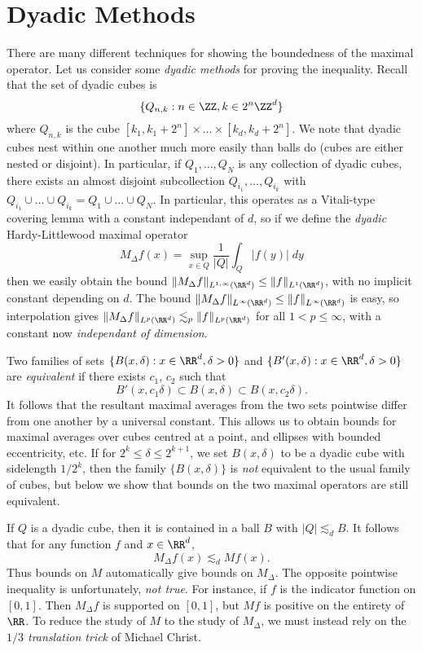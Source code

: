 \section{Dyadic Methods}

There are many different techniques for showing the boundedness of the maximal operator. Let us consider some \emph{dyadic methods} for proving the inequality. Recall that the set of dyadic cubes is
%
\[ \{ Q_{n,k} : n \in \ZZ, k \in 2^n \ZZ^d \} \]
%
where $Q_{n,k}$ is the cube $[k_1, k_1 + 2^n] \times \dots \times [k_d, k_d + 2^n]$. We note that dyadic cubes nest within one another much more easily than balls do (cubes are either nested or disjoint). In particular, if $Q_1,\dots,Q_N$ is any collection of dyadic cubes, there exists an almost disjoint subcollection $Q_{i_1}, \dots, Q_{i_k}$ with $Q_{i_1} \cup \dots \cup Q_{i_k} = Q_1 \cup \dots \cup Q_N$. In particular, this operates as a Vitali-type covering lemma with a constant independant of $d$, so if we define the \emph{dyadic} Hardy-Littlewood maximal operator
%
\[ M_\Delta f(x) = \sup_{x \in Q} \frac{1}{|Q|} \int_Q |f(y)|\; dy \]
%
then we easily obtain the bound $\| M_\Delta f \|_{L^{1,\infty}(\RR^d)} \leq \| f \|_{L^1(\RR^d)}$, with no implicit constant depending on $d$. The bound $\| M_\Delta f \|_{L^\infty(\RR^d)} \leq \| f \|_{L^\infty(\RR^d)}$ is easy, so interpolation gives $\| M_\Delta f \|_{L^p(\RR^d)} \lesssim_p \| f \|_{L^p(\RR^d)}$ for all $1 < p \leq \infty$, with a constant now \emph{independant of dimension}.

Two families of sets $\{ B(x,\delta) : x \in \RR^d, \delta > 0 \}$ and $\{ B'(x,\delta) : x \in \RR^d, \delta > 0 \}$ are \emph{equivalent} if there exists $c_1$, $c_2$ such that
%
\[ B'(x, c_1 \delta) \subset B(x,\delta) \subset B(x,c_2 \delta). \]
%
It follows that the resultant maximal averages from the two sets pointwise differ from one another by a universal constant. This allows us to obtain bounds for maximal averages over cubes centred at a point, and ellipses with bounded eccentricity, etc. If for $2^k \leq \delta \leq 2^{k+1}$, we set $B(x,\delta)$ to be a dyadic cube with sidelength $1/2^k$, then the family $\{ B(x,\delta) \}$ is \emph{not} equivalent to the usual family of cubes, but below we show that bounds on the two maximal operators are still equivalent.

If $Q$ is a dyadic cube, then it is contained in a ball $B$ with $|Q| \lesssim_d B$. It follows that for any function $f$ and $x \in \RR^d$,
%
\[ M_\Delta f(x) \lesssim_d Mf(x). \]
%
Thus bounds on $M$ automatically give bounds on $M_\Delta$. The opposite pointwise inequality is unfortunately, \emph{not true}. For instance, if $f$ is the indicator function on $[0,1]$. Then $M_\Delta f$ is supported on $[0,1]$, but $Mf$ is positive on the entirety of $\RR$. To reduce the study of $M$ to the study of $M_\Delta$, we must instead rely on the \emph{$1/3$ translation trick} of Michael Christ.

